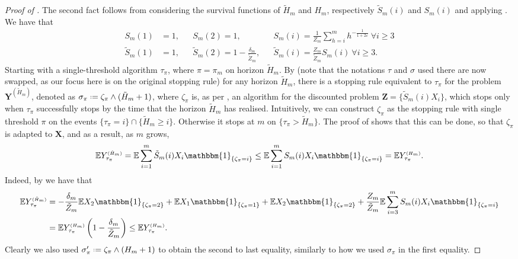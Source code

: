 \documentclass[11pt, a4paper, twoside]{article}
\newcommand*{\defeq}{\mathrel{\vcenter{\baselineskip0.5ex \lineskiplimit0pt
			\hbox{\scriptsize.}\hbox{\scriptsize.}}}=}
\newcommand{\ssup}[1]{{\scriptscriptstyle{({#1})}}}
\newcommand{\eps}{\varepsilon}
\newcommand{\EE}{\mathbb{E}}
\newcommand{\YY}{\mathbf{Y}}
\newcommand{\XX}{\mathbf{X}}
\newcommand{\DZ}{\mathbf{Z}}
\newcommand{\II}{\mathbbm{1}}
\numberwithin{equation}{section}
\begin{document}
\begin{proof}[Proof of ]
		The second fact follows from considering the survival functions of $\tilde{H}_m$ and $H_m$, respectively $\tilde{S}_m(i)$ and $S_m(i)$ and applying . We have that
		\begin{equation}\label{survivals}
		\begin{aligned}
			S_m(1)&=1, &&S_m(2)=1, &&S_m(i)=\frac{1}{Z_m}\sum_{h= i}^mh^{-\frac{1}{1+2\eps}}\:\forall i\ge 3\\
			\tilde{S}_m(1)&=1, &&\tilde{S}_m(2)=1-\frac{\delta_m}{\tilde{Z}_m},  &&\tilde{S}_m(i)=\frac{Z_m}{\tilde{Z}_m}S_m(i)\:\forall i\ge 3.
		\end{aligned}
		\end{equation}
		Starting with a single-threshold algorithm $\tau_\pi$, where $\pi=\pi_m$ on horizon $\tilde{H}_m$. By  (note that the notations $\tau$ and $\sigma$ used there are now swapped, as our focus here is on the original stopping rule) for any horizon $\tilde{H}_m$, there is a stopping rule equivalent to $\tau_\pi$ for the problem $\YY^\ssup{\tilde{H}_m}$, denoted as $\sigma_\pi\defeq\zeta_\pi\wedge (\tilde{H}_m+1)$, where $\zeta_\pi$ is, as per , an algorithm for the discounted problem $\DZ=\{\tilde{S}_m(i)X_i\}$, which stops only when $\tau_\pi$ successfully stops by the time that the horizon $\tilde{H}_m$ has realised. Intuitively, we can construct $\zeta_\pi$ as the stopping rule with single threshold $\pi$ on the events $\{\tau_\pi=i\}\cap\{\tilde{H}_m\ge i\}$. Otherwise it stops at $m$ on $\{\tau_\pi>\tilde{H}_m\}$. The proof of  shows that this can be done, so that $\zeta_\pi$ is adapted to $\XX$, and as a result, as $m$ grows, 
		\[\EE Y_{\tau_\pi}^\ssup{\tilde{H}_m}=\EE\sum_{i=1}^m \tilde{S}_m(i)X_i\II_{\{\zeta_\pi=i\}}\le\EE\sum_{i=1}^m S_m(i)X_i\II_{\{\zeta_\pi=i\}}=\EE Y_{\tau_\pi}^\ssup{H_m}.\]
		Indeed, by  we have that\begin{align*}
			\EE Y_{\tau_\pi}^\ssup{\tilde{H}_m}&=-\frac{\delta_m}{\tilde{Z}_m}\EE X_2\II_{\{\zeta_\pi=2\}}+\EE X_1\II_{\{\zeta_\pi=1\}}+\EE X_2\II_{\{\zeta_\pi=2\}}+\frac{Z_m}{\tilde{Z}_m}\EE\sum_{i=3}^m S_m(i)X_i\II_{\{\zeta_\pi=i\}}\\
			&=\EE Y_{\tau_\pi}^\ssup{H_m}\left(1-\frac{\delta_m}{\tilde{Z}_m}\right)\le\EE Y_{\tau_\pi}^\ssup{H_m}.
		\end{align*}
		Clearly we also used $\sigma'_\pi\defeq\zeta_\pi\wedge (H_m+1)$ to obtain the second to last equality, similarly to how we used $\sigma_\pi$ in the first equality.
		

\end{proof}
\end{document}
